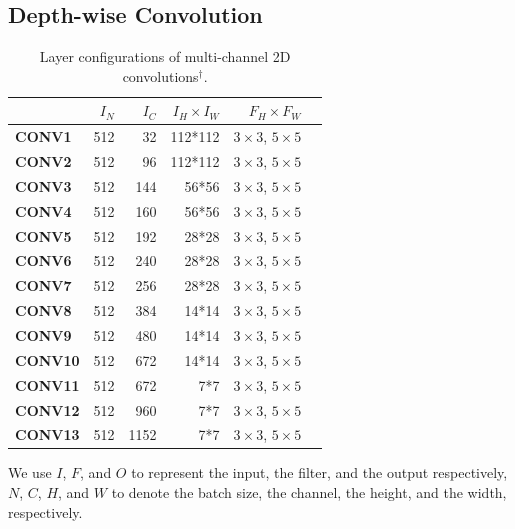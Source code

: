 \subsection{Depth-wise Convolution}
\label{sec:depconvexp}

\begin{table}[]
\caption{Layer configurations of multi-channel 2D convolutions$^{\dag}$.}
\label{tab:3dconvconfigs}
\centering
{}
\begin{threeparttable}
\begin{tabular}{lrrrrr}
\toprule
& \textbf{$I_N$} & \textbf{$I_C$} & \textbf{$I_H \times I_W$ }&  \textbf{$F_H \times F_W$} \\
\midrule
\textbf{CONV1} & 512  & 32    & 112*112 & $3 \times 3$, $5 \times 5$  \\
\textbf{CONV2} & 512  & 96    & 112*112  &$3 \times 3$, $5 \times 5$   \\
\textbf{CONV3} & 512  & 144   & 56*56  &$3 \times 3$, $5 \times 5$    \\
\textbf{CONV4} & 512  & 160    & 56*56  &$3 \times 3$, $5 \times 5$    \\
\textbf{CONV5} & 512  & 192   & 28*28  &$3 \times 3$, $5 \times 5$    \\
\textbf{CONV6} & 512  & 240   & 28*28  &$3 \times 3$, $5 \times 5$    \\
\textbf{CONV7} & 512  & 256   & 28*28  &$3 \times 3$, $5 \times 5$    \\
\textbf{CONV8} & 512  & 384   & 14*14  &$3 \times 3$, $5 \times 5$    \\
\textbf{CONV9} & 512  & 480   & 14*14  &$3 \times 3$, $5 \times 5$    \\
\textbf{CONV10} & 512  & 672  & 14*14 &$3 \times 3$, $5 \times 5$     \\
\textbf{CONV11} & 512  &672  & 7*7 & $3 \times 3$, $5 \times 5$      \\
\textbf{CONV12} & 512  &960  & 7*7 & $3 \times 3$, $5 \times 5$      \\
\textbf{CONV13} & 512  &1152  & 7*7 & $3 \times 3$, $5 \times 5$      \\
\bottomrule
\end{tabular}
\footnotesize
\begin{tablenotes}
\item[\dag] We use $I$, $F$, and $O$ to represent the input, the filter, and the output respectively, $N$, $C$, $H$, and $W$
to denote the batch size, the channel, the height, and the width, respectively.
\end{tablenotes}
\end{threeparttable}
\end{table}

